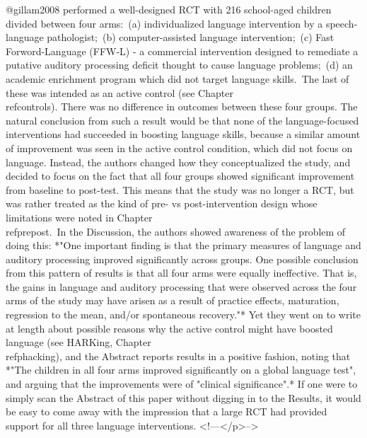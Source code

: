 \documentclass{krantz}
\begin{document}
\begin{tcolorbox}[colback=Black!5!lightgray,colframe=black!75!black,coltitle=white,title=An example of spin in evaluating speech and language therapy]\label{box:spin}
@gillam2008 performed a well-designed RCT with 216 school-aged children divided between four arms:\
(a) individualized language intervention by a speech-language pathologist;\
(b) computer-assisted language intervention;\
(c) Fast Forword-Language (FFW-L) - a commercial intervention designed to remediate a putative auditory processing deficit thought to cause language problems;\
(d) an academic enrichment program which did not target language skills.\
The last of these was intended as an active control (see Chapter \\ref{controls}). There was no difference in outcomes between these four groups. The natural conclusion from such a result would be that none of the language-focused interventions had succeeded in boosting language skills, because a similar amount of improvement was seen in the active control condition, which did not focus on language. Instead, the authors changed how they conceptualized the study, and decided to focus on the fact that all four groups showed significant improvement from baseline to post-test. This means that the study was no longer a RCT, but was rather treated as the kind of pre- vs post-intervention design whose limitations were noted in Chapter \\ref{prepost}.\
In the Discussion, the authors showed awareness of the problem of doing this: *"One important finding is that the primary measures of language and auditory processing improved significantly across groups. One possible conclusion from this pattern of results is that all four arms were equally ineffective. That is, the gains in language and auditory processing that were observed across the four arms of the study may have arisen as a result of practice effects, maturation, regression to the mean, and/or spontaneous recovery."* Yet they went on to write at length about possible reasons why the active control might have boosted language (see HARKing, Chapter \\ref{phacking}), and the Abstract reports results in a positive fashion, noting that *"The children in all four arms improved significantly on a global language test", and arguing that the improvements were of "clinical significance".* If one were to simply scan the Abstract of this paper without digging in to the Results, it would be easy to come away with the impression that a large RCT had provided support for all three language interventions.
<!---</p>-->
\end{tcolorbox}
\end{document}
